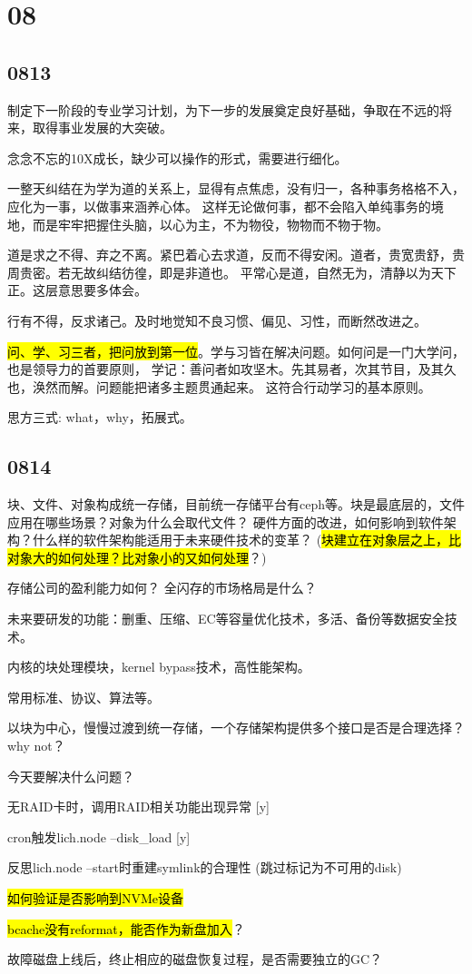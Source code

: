 \section{08}

\subsection{0813}

制定下一阶段的专业学习计划，为下一步的发展奠定良好基础，争取在不远的将来，取得事业发展的大突破。

念念不忘的10X成长，缺少可以操作的形式，需要进行细化。

一整天纠结在为学为道的关系上，显得有点焦虑，没有归一，各种事务格格不入，应化为一事，以做事来涵养心体。
这样无论做何事，都不会陷入单纯事务的境地，而是牢牢把握住头脑，以心为主，不为物役，物物而不物于物。

道是求之不得、弃之不离。紧巴着心去求道，反而不得安闲。道者，贵宽贵舒，贵周贵密。若无故纠结彷徨，即是非道也。
平常心是道，自然无为，清静以为天下正。这层意思要多体会。

行有不得，反求诸己。及时地觉知不良习惯、偏见、习性，而断然改进之。

\hl{问、学、习三者，把问放到第一位}。学与习皆在解决问题。如何问是一门大学问，也是领导力的首要原则，
学记：善问者如攻坚木。先其易者，次其节目，及其久也，涣然而解。问题能把诸多主题贯通起来。
这符合行动学习的基本原则。

思方三式: what，why，拓展式。

\subsection{0814}

块、文件、对象构成统一存储，目前统一存储平台有ceph等。块是最底层的，文件应用在哪些场景？对象为什么会取代文件？
硬件方面的改进，如何影响到软件架构？什么样的软件架构能适用于未来硬件技术的变革？
(\hl{块建立在对象层之上，比对象大的如何处理？比对象小的又如何处理}？)

存储公司的盈利能力如何？ 
全闪存的市场格局是什么？

未来要研发的功能：删重、压缩、EC等容量优化技术，多活、备份等数据安全技术。

内核的块处理模块，kernel bypass技术，高性能架构。

常用标准、协议、算法等。

以块为中心，慢慢过渡到统一存储，一个存储架构提供多个接口是否是合理选择？why not？

今天要解决什么问题？
\begin{enumbox}
\item 无RAID卡时，调用RAID相关功能出现异常 [y]
\item cron触发lich.node --disk\_load [y]
\item 反思lich.node --start时重建symlink的合理性 (跳过标记为不可用的disk)
\item \hl{如何验证是否影响到NVMe设备}
\item \hl{bcache没有reformat，能否作为新盘加入}？
\item 故障磁盘上线后，终止相应的磁盘恢复过程，是否需要独立的GC？
\end{enumbox}

